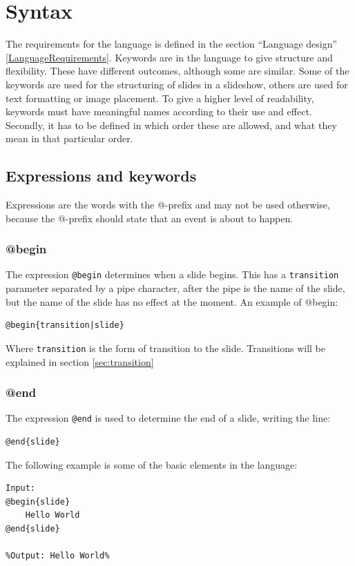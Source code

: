 \chapter{Syntax}
\label{SSyntax}

The requirements for the language is defined in the section ``Language design'' \ref{LanguageRequirements}. Keywords are in the language to give structure and flexibility. These have different outcomes, although some are similar. Some of the keywords are used for the structuring of slides in a slideshow, others are used for text formatting or image placement. To give a higher level of readability, keywords must have meaningful names according to their use and effect. Secondly, it has to be defined in which order these are allowed, and what they mean in that particular order.

\section{Expressions and keywords}
Expressions are the words with the @-prefix and may not be used otherwise, because the @-prefix should state that an event is about to happen.

\subsection{@begin}
\label{@begin}
The expression \texttt{@begin} determines when a slide begins. This has a \texttt{transition} parameter separated by a pipe character, after the pipe is the name of the slide, but the name of the slide has no effect at the moment. An example of @begin:
\begin{lstlisting}[frame=single, caption=begin expression generic]
@begin{transition|slide}
\end{lstlisting}
Where \texttt{transition} is the form of transition to the slide. Transitions will be explained in section \ref{sec:transition}

\subsection{@end}
\label{@end}
The expression \texttt{@end} is used to determine the end of a slide, writing the line: 
\begin{lstlisting}[frame=single, caption=end expression generic]
@end{slide}
\end{lstlisting}

The following example is some of the basic elements in the language:
\begin{lstlisting}[frame=single]
Input:
@begin{slide}
    Hello World
@end{slide}

%Output: Hello World%
\end{lstlisting}

